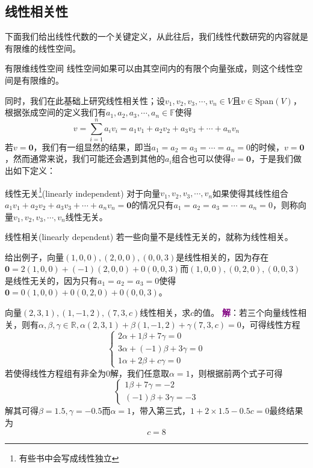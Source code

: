 \subsection{线性相关性}

\label{subsec:LinearDependence}
下面我们给出线性代数的一个关键定义，从此往后，我们线性代数研究的内容就是有限维的线性空间。

\begin{definition}{有限维线性空间}
	线性空间如果可以由其空间内的有限个向量张成，则这个线性空间是有限维的。
\end{definition}

同时，我们在此基础上研究线性相关性；设$v_1,v_2,v_3,\cdots,v_n \in V$且$v \in \text{Span}(V)$，根据张成空间的定义我们有$a_1,a_2,a_3,\cdots,a_n \in \mathbb{F}$使得$$v = \sum_{i=1}^{n}a_iv_i =a_1v_1+a_2v_2+a_3v_3+\cdots+a_nv_n$$若$v=\boldsymbol{0}$，我们有一组显然的结果，即当$a_1=a_2=a_3=\cdots=a_n=0$的时候，$v=\boldsymbol{0}$，然而通常来说，我们可能还会遇到其他的$a_i$组合也可以使得$v=\boldsymbol{0}$，于是我们做出如下定义：

\begin{definition}{线性无关\footnote{有些书中会写成线性独立}(linearly independent)}
	对于向量$v_1,v_2,v_3,\cdots,v_n$如果使得其线性组合$a_1v_1+a_2v_2+a_3v_3+\cdots+a_nv_n=\boldsymbol{0}$的情况只有$a_1=a_2=a_3=\cdots=a_n=0$，则称向量$v_1,v_2,v_3,\cdots,v_n$线性无关。
\end{definition}

\begin{definition}{线性相关(linearly dependent)}
	若一些向量不是线性无关的，就称为线性相关。
\end{definition}

给出例子，向量$(1,0,0),(2,0,0),(0,0,3)$是线性相关的，因为存在$\boldsymbol{0}=2(1,0,0)+(-1)(2,0,0)+0(0,0,3)$而$(1,0,0),(0,2,0),(0,0,3)$是线性无关的，因为只有$a_1=a_2=a_3=0$使得$\boldsymbol{0}=0(1,0,0)+0(0,2,0)+0(0,0,3)$。

\begin{example}
	向量$(2,3,1),(1,-1,2),(7,3,c)$线性相关，求$c$的值。
	\tcblower
	\textcolor{purple}{\textbf{解}}：若三个向量线性相关，则有$\alpha,\beta,\gamma \in \mathbb{R},\alpha (2,3,1)+\beta (1,-1,2)+\gamma (7,3,c)=0$，可得线性方程$$\left\{\begin{matrix} 
		2\alpha +1\beta+7\gamma = 0 \\  
		3\alpha +(-1)\beta+3\gamma=0 \\
		1\alpha +2\beta+c\gamma=0
	  \end{matrix}\right.$$若使得线性方程组有非全为0解，我们任意取$\alpha = 1$，则根据前两个式子可得$$\left\{\begin{matrix} 
		1\beta+7\gamma = -2 \\
		(-1)\beta+3\gamma= -3 
		\end{matrix}\right.$$解其可得$\beta=1.5,\gamma=-0.5$而$\alpha=1$，带入第三式，$1+2\times 1.5-0.5c=0$最终结果为$$c=8$$
\end{example}

